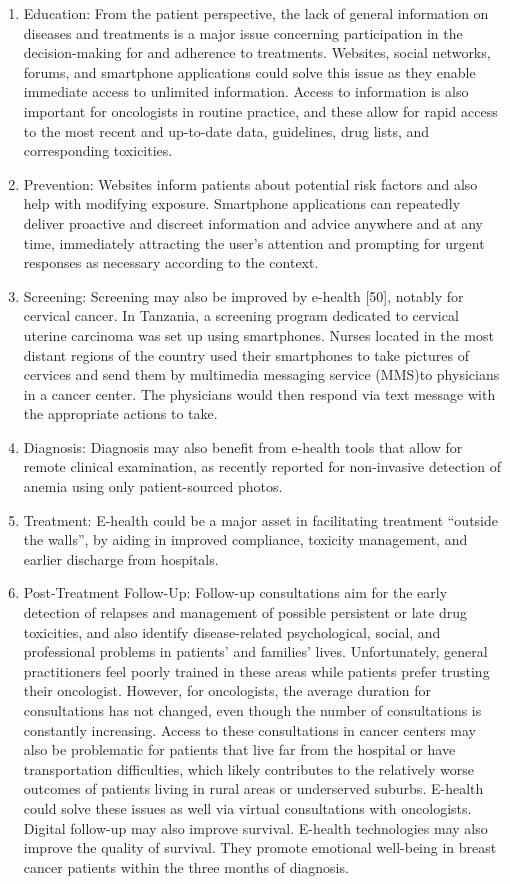 \begin{enumerate}
    \item Education: From the patient perspective, the lack of general information on diseases and treatments is a major issue concerning participation in the decision-making for and adherence to treatments. Websites, social networks, forums, and smartphone applications could solve this issue as they enable immediate access to unlimited information. Access to information is also important for oncologists in routine practice, and these allow for rapid access to the most recent and up-to-date data, guidelines, drug lists, and corresponding toxicities.
    \item Prevention: Websites inform patients about potential risk factors and also help with modifying exposure. Smartphone applications can repeatedly deliver proactive and discreet information and advice anywhere and at any time, immediately attracting the user's attention and prompting for urgent responses as necessary according to the context.
    \item Screening: Screening may also be improved by e-health [50], notably for cervical cancer. In Tanzania, a screening program dedicated to cervical uterine carcinoma was set up using smartphones. Nurses located in the most distant regions of the country used their smartphones to take pictures of cervices and send them by multimedia messaging service (MMS)to physicians in a cancer center. The physicians would then respond via text message with the appropriate actions to take.
    \item Diagnosis: Diagnosis may also benefit from e-health tools that allow for remote clinical examination, as recently reported for non-invasive detection of anemia using only patient-sourced photos.
    \item Treatment: E-health could be a major asset in facilitating treatment ``outside the walls'', by aiding in improved compliance, toxicity management, and earlier discharge from hospitals.
    \item Post-Treatment Follow-Up: Follow-up consultations aim for the early detection of relapses and management of possible persistent or late drug toxicities, and also identify disease-related psychological, social, and professional problems in patients' and families' lives. Unfortunately, general practitioners feel poorly trained in these areas while patients prefer trusting their oncologist. However, for oncologists, the average duration for consultations has not changed, even though the number of consultations is constantly increasing. Access to these consultations in cancer centers may also be problematic for patients that live far from the hospital or have transportation difficulties, which likely contributes to the relatively worse outcomes of patients living in rural areas or underserved suburbs. E-health could solve these issues as well via virtual consultations with oncologists. Digital follow-up may also improve survival. E-health technologies may also improve the quality of survival. They promote emotional well-being in breast cancer patients within the three months of diagnosis.
\end{enumerate}

